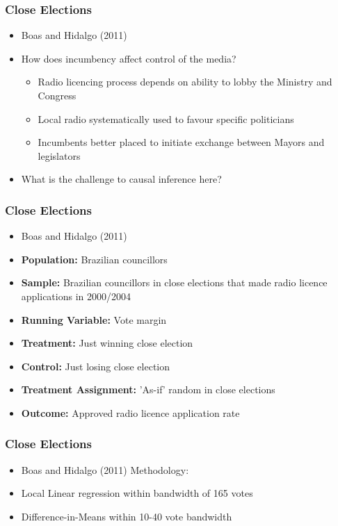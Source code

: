 \documentclass[xcolor=x11names,compress]{beamer}\usepackage[]{graphicx}\usepackage[]{color}
\renewcommand{\(}{\begin{columns}}
\renewcommand{\)}{\end{columns}}
\newcommand{\<}[1]{\begin{column}{#1}}
\renewcommand{\>}{\end{column}}
\begin{document}
\begin{frame}
\frametitle{Close Elections}
\begin{itemize}
\item Boas and Hidalgo (2011)
\pause
\item How does incumbency affect control of the media?
\pause
\begin{itemize}
\item Radio licencing process depends on ability to lobby the Ministry and Congress
\pause
\item Local radio systematically used to favour specific politicians
\pause
\item Incumbents better placed to initiate exchange between Mayors and legislators
\pause
\end{itemize}
\item What is the challenge to causal inference here?
\end{itemize}
\end{frame}

\begin{frame}
\frametitle{Close Elections}
\begin{itemize}
\item Boas and Hidalgo (2011)
\pause
\item \textbf{Population:} \pause Brazilian councillors
\item \textbf{Sample:} \pause Brazilian councillors in close elections that made radio licence applications in 2000/2004
\item \textbf{Running Variable:} \pause Vote margin
\item \textbf{Treatment:} \pause Just winning close election
\item \textbf{Control:} \pause Just losing close election
\item \textbf{Treatment Assignment:} \pause 'As-if' random in close elections
\item \textbf{Outcome:} \pause Approved radio licence application rate
\end{itemize}
\end{frame}

\begin{frame}
\frametitle{Close Elections}
\begin{itemize}
\item Boas and Hidalgo (2011) Methodology:
\pause
\item Local Linear regression within bandwidth of 165 votes
\item Difference-in-Means within 10-40 vote bandwidth
\end{itemize}
\end{frame}
\end{document}

